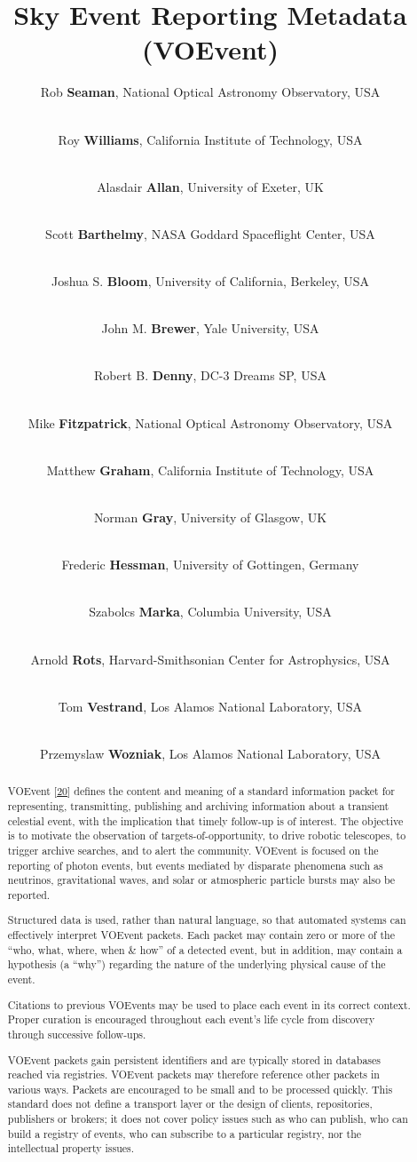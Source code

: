 \documentclass[11pt,a4paper]{ivoa}
\title{Sky Event Reporting Metadata (VOEvent)}
\author{Rob {\bf Seaman}, National Optical Astronomy Observatory, USA}
\author{\\Roy {\bf Williams}, California Institute of Technology, USA}
\author{\\Alasdair {\bf Allan}, University of Exeter, UK}
\author{\\Scott {\bf Barthelmy}, NASA Goddard Spaceflight Center, USA}
\author{\\Joshua S. {\bf Bloom}, University of California, Berkeley, USA}
\author{\\John M. {\bf Brewer}, Yale University, USA}
\author{\\Robert B. {\bf Denny}, DC-3 Dreams SP, USA}
\author{\\Mike {\bf Fitzpatrick}, National Optical Astronomy Observatory, USA}
\author{\\Matthew {\bf Graham}, California Institute of Technology, USA}
\author{\\Norman {\bf Gray}, University of Glasgow, UK}
\author{\\Frederic {\bf Hessman}, University of Gottingen, Germany}
\author{\\Szabolcs {\bf Marka}, Columbia University, USA}
\author{\\Arnold {\bf Rots}, Harvard-Smithsonian Center for Astrophysics, USA}
\author{\\Tom {\bf Vestrand}, Los Alamos National Laboratory, USA}
\author{\\Przemyslaw {\bf Wozniak}, Los Alamos National Laboratory, USA}
\begin{document}
\begin{abstract}
VOEvent [\hyperref[bib20]{20}] defines the content and meaning of a standard information packet for representing, transmitting, publishing and archiving information about a transient celestial event, with the implication that timely follow-up is of interest. The objective is to motivate the observation of targets-of-opportunity, to drive robotic telescopes, to trigger archive searches, and to alert the community. VOEvent is focused on the reporting of photon events, but events mediated by disparate phenomena such as neutrinos, gravitational waves, and solar or atmospheric particle bursts may also be reported.

Structured data is used, rather than natural language, so that automated systems can effectively interpret VOEvent packets. Each packet may contain zero or more of the ``who, what, where, when \& how'' of a detected event, but in addition, may contain a hypothesis (a ``why'') regarding the nature of the underlying physical cause of the event. 

Citations to previous VOEvents may be used to place each event in its correct context. Proper curation is encouraged throughout each event's life cycle from discovery through successive follow-ups. 

VOEvent packets gain persistent identifiers and are typically stored in databases reached via registries. VOEvent packets may therefore reference other packets in various ways. Packets are encouraged to be small and to be processed quickly. This standard does not define a transport layer or the design of clients, repositories, publishers or brokers; it does not cover policy issues such as who can publish, who can build a registry of events, who can subscribe to a particular registry, nor the intellectual property issues.
\end{abstract}


%
%
\end{document}
